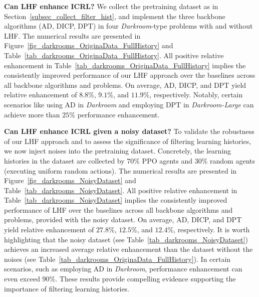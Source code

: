 \documentclass{article}
\begin{document}
\textbf{Can LHF enhance ICRL?}
%
We collect the pretraining dataset as in Section~\ref{subsec_collect_filter_hist}, and implement the three backbone algorithms (AD, DICP, DPT) in four \textit{Darkroom}-type problems with and without LHF.
%
The numerical results are presented in Figure~\ref{fig_darkrooms_OriginaData_FullHistory} and Table~\ref{tab_darkrooms_OriginaData_FullHistory}.
%
All positive relative enhancement in Table~\ref{tab_darkrooms_OriginaData_FullHistory} implies the consistently improved performance of our LHF approach over the baselines across all backbone algorithms and problems. 
%
On average, AD, DICP, and DPT yield relative enhancement of $8.8\%$, $9.1\%$, and $11.9\%$, respectively. Notably, certain scenarios like using AD in \textit{Darkroom} and employing DPT in \textit{Darkroom-Large} can achieve more than $25\%$ performance enhancement.






\textbf{Can LHF enhance ICRL given a noisy dataset?}
%
To validate the robustness of our LHF approach and to assess the significance of filtering learning histories, we now inject noises into the pretraining dataset. Concretely, the learning histories in the dataset are collected by $70\%$ PPO agents and $30\%$ random agents (executing uniform random actions).
%
%
The numerical results are presented in Figure~\ref{fig_darkrooms_NoisyDataset} and Table~\ref{tab_darkrooms_NoisyDataset}.
%
All positive relative enhancement in Table~\ref{tab_darkrooms_NoisyDataset} implies the consistently improved performance of LHF over the baselines across all backbone algorithms and problems, provided with the noisy dataset. 
%
On average, AD, DICP, and DPT yield relative enhancement of $27.8\%$, $12.5\%$, and $12.4\%$, respectively. It is worth highlighting that the noisy dataset (see Table~\ref{tab_darkrooms_NoisyDataset}) achieves an increased average relative enhancement than the dataset without the noises (see Table~\ref{tab_darkrooms_OriginaData_FullHistory}). In certain scenarios, such as employing AD in \textit{Darkroom}, performance enhancement can even exceed $90\%$. These results provide compelling evidence supporting the importance of filtering learning histories.
\end{document}
